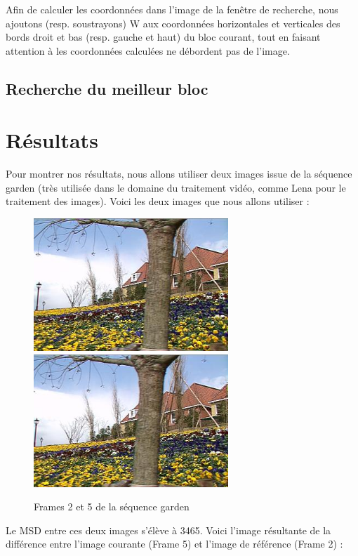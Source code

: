 \documentclass[a4paper, 12pt]{article}
\begin{document}
Afin de calculer les coordonnées dans l'image de la fenêtre de recherche, nous ajoutons (resp. soustrayons) W aux coordonnées horizontales et verticales des bords droit et bas (resp. gauche et haut) du bloc courant, tout en faisant attention à les coordonnées calculées ne débordent pas de l'image.


\subsection{Recherche du meilleur bloc}

\newpage
\section{Résultats}

Pour montrer nos résultats, nous allons utiliser deux images issue de la séquence garden (très utilisée dans le domaine du traitement vidéo, comme Lena pour le traitement des images). Voici les deux images que nous allons utiliser : 

\begin{figure}[H]
	\centering
	\includegraphics[height=5cm]{../garden1.jpg}
	\includegraphics[height=5cm]{../garden2.jpg}
	\caption{Frames 2 et 5 de la séquence garden}
	\label{fig:garden}
\end{figure}

Le MSD entre ces deux images s'élève à 3465. Voici l'image résultante de la différence entre l'image courante (Frame 5) et l'image de référence (Frame 2) :
\end{document}
